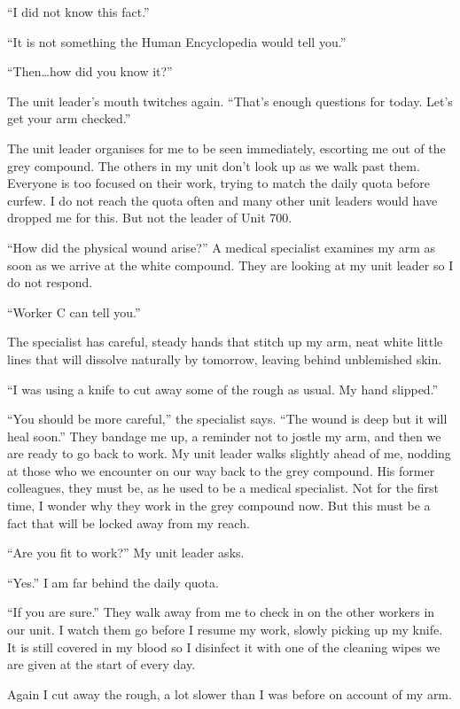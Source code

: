 “I did not know this fact.”

“It is not something the Human Encyclopedia would tell you.”

“Then…how did you know it?”

The unit leader’s mouth twitches again. “That’s enough questions for today. Let’s get your arm checked.”

The unit leader organises for me to be seen immediately, escorting me out of the grey compound. The others in my unit don’t look up as we walk past them. Everyone is too focused on their work, trying to match the daily quota before curfew. I do not reach the quota often and many other unit leaders would have dropped me for this. But not the leader of Unit 700.

“How did the physical wound arise?” A medical specialist examines my arm as soon as we arrive at the white compound. They are looking at my unit leader so I do not respond.

“Worker C can tell you.”

The specialist has careful, steady hands that stitch up my arm, neat white little lines that will dissolve naturally by tomorrow, leaving behind unblemished skin. 

“I was using a knife to cut away some of the rough as usual. My hand slipped.”

“You should be more careful,” the specialist says. “The wound is deep but it will heal soon.” They bandage me up, a reminder not to jostle my arm, and then we are ready to go back to work. My unit leader walks slightly ahead of me, nodding at those who we encounter on our way back to the grey compound. His former colleagues, they must be, as he used to be a medical specialist. Not for the first time, I wonder why they work in the grey compound now. But this must be a fact that will be locked away from my reach.

“Are you fit to work?” My unit leader asks.

“Yes.” I am far behind the daily quota.

“If you are sure.” They walk away from me to check in on the other workers in our unit. I watch them go before I resume my work, slowly picking up my knife. It is still covered in my blood so I disinfect it with one of the cleaning wipes we are given at the start of every day.

Again I cut away the rough, a lot slower than I was before on account of my arm. 
\vspace{1em}

